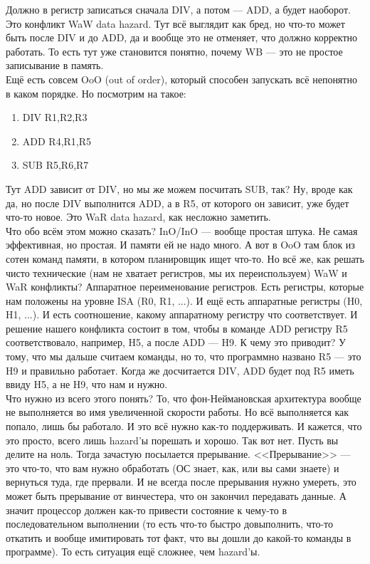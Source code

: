 \documentclass{article}
\begin{document}
    Должно в регистр записаться сначала DIV, а потом --- ADD, а будет наоборот. Это конфликт WaW data hazard. Тут всё выглядит как бред, но что-то может быть после DIV и до ADD, да и вообще это не отменяет, что должно корректно работать. То есть тут уже становится понятно, почему WB --- это не простое записывание в память.\\
    Ещё есть совсем OoO (out of order), который способен запускать всё непонятно в каком порядке. Но посмотрим на такое:
    \begin{enumerate}[1.]
        \item DIV R1,R2,R3
        \item ADD R4,R1,R5
        \item SUB R5,R6,R7
    \end{enumerate}
    Тут ADD зависит от DIV, но мы же можем посчитать SUB, так? Ну, вроде как да, но после DIV выполнится ADD, а в R5, от которого он зависит, уже будет что-то новое. Это WaR data hazard, как несложно заметить.\\
    Что обо всём этом можно сказать? InO/InO --- вообще простая штука. Не самая эффективная, но простая. И памяти ей не надо много. А вот в OoO там блок из сотен команд памяти, в котором планировщик ищет что-то. Но всё же, как решать чисто технические (нам не хватает регистров, мы их переиспользуем) WaW и WaR конфликты? Аппаратное переименование регистров. Есть регистры, которые нам положены на уровне ISA (R0, R1, ...). И ещё есть аппаратные регистры (H0, H1, ...). И есть соотношение, какому аппаратному регистру что соответствует. И решение нашего конфликта состоит в том, чтобы в команде ADD регистру R5 соответствовало, например, H5, а после ADD --- H9. К чему это приводит? У тому, что мы дальше считаем команды, но то, что программно названо R5 --- это H9 и правильно работает. Когда же досчитается DIV, ADD будет под R5 иметь ввиду H5, а не H9, что нам и нужно.\\
    Что нужно из всего этого понять? То, что фон-Неймановская архитектура вообще не выполняется во имя увеличенной скорости работы. Но всё выполняется как попало, лишь бы работало. И это всё нужно как-то поддерживать. И кажется, что это просто, всего лишь hazard'ы порешать и хорошо. Так вот нет. Пусть вы делите на ноль. Тогда зачастую посылается прерывание. <<Прерывание>> --- это что-то, что вам нужно обработать (ОС знает, как, или вы сами знаете) и вернуться туда, где прервали. И не всегда после прерывания нужно умереть, это может быть прерывание от винчестера, что он закончил передавать данные. А значит процессор должен как-то привести состояние к чему-то в последовательном выполнении (то есть что-то быстро довыполнить, что-то откатить и вообще имитировать тот факт, что вы дошли до какой-то команды в программе). То есть ситуация ещё сложнее, чем hazard'ы.\\
\end{document}
